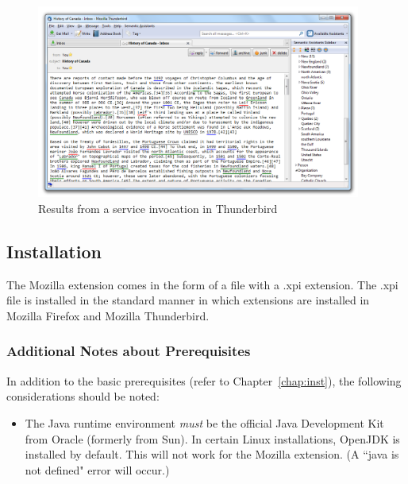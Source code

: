 \begin{figure}[htb]
  \centering
  \includegraphics[width=0.95\textwidth]{pictures/mozilla_features_thunderbird_window_message_tab.png}
  \caption{Results from a service invocation in Thunderbird}
  \label{fig:mozilla_features_thunderbird_window_message_tab}
\end{figure}

\subsection{Installation}
\label{subsec:mozilla_installation}
The Mozilla extension comes in the form of a file with a .xpi extension. The .xpi file is installed in the standard manner in which extensions are installed in Mozilla Firefox and Mozilla Thunderbird. 

\subsubsection{Additional Notes about Prerequisites}
In addition to the basic prerequisites (refer to Chapter~\ref{chap:inst}), the following considerations should be noted: 
\begin{itemize}
  \item The Java runtime environment \emph{must} be the official Java Development Kit from Oracle (formerly from Sun). In certain Linux installations, OpenJDK is installed by default. This will not work for the Mozilla extension. (A ``java is not defined" error will occur.)
\end{itemize}

